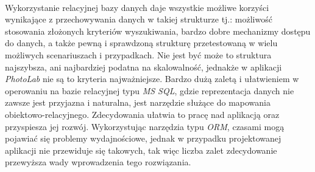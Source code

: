     \\
    Wykorzystanie relacyjnej bazy danych daje wszystkie możliwe korzyści wynikające z przechowywania danych w takiej strukturze tj.: możliwość stosowania złożonych kryteriów wyszukiwania, bardzo dobre mechanizmy dostępu do danych, a także pewną i sprawdzoną strukturę przetestowaną w wielu możliwych scenariuszach i przypadkach. Nie jest być może to struktura najszybsza, ani najbardziej podatna na skalowalność, jednakże w aplikacji \textit{PhotoLab} nie są to kryteria najważniejsze. Bardzo dużą zaletą i ułatwieniem w operowaniu na bazie relacyjnej typu \textit{MS SQL}, gdzie reprezentacja danych nie zawsze jest przyjazna i naturalna, jest narzędzie służące do mapowania obiektowo-relacyjnego. Zdecydowania ułatwia to pracę nad aplikacją oraz przyspiesza jej rozwój. Wykorzystując narzędzia typu \textit{ORM}, czasami mogą pojawiać się problemy wydajnościowe, jednak w przypadku projektowanej aplikacji nie przewiduje się takowych, tak więc liczba zalet zdecydowanie przewyższa wady wprowadzenia tego rozwiązania.
    
